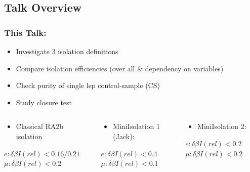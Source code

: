 \documentclass{beamer}
\begin{document}
\subsection{Talk Overview}

\begin{frame}
\frametitle{This Talk:}
\begin{itemize}
 \item Investigate 3 isolation definitions
 \item Compare isolation efficiencies (over all \& dependency on variables)
 \item Check purity of single lep control-sample (CS)
 \item Study closure test
\end{itemize}
\vskip1cm
 \begin{columns}

   \begin{column}{0.33\textwidth}
   \begin{itemize}
    \item Classical RA2b isolation
    \end{itemize}
   $e : \delta \beta I(rel)<0.16/0.21$
   $\mu : \delta \beta I(rel)<0.2$
 \end{column}
 \begin{column}{0.33\textwidth}
  \begin{itemize}
   \item MiniIsolation 1 (Jack):
   \end{itemize}
   $e : \delta \beta I(rel)<0.4$
   $\mu : \delta \beta I(rel)<0.1$
   
 \end{column}
 \begin{column}{0.33\textwidth}
  \begin{itemize}
   \item MiniIsolation 2:
   \end{itemize}
   $e : \delta \beta I(rel)<0.2$
   $\mu : \delta \beta I(rel)<0.2$
 
 \end{column}
 \end{columns}
\end{frame}
\end{document}
